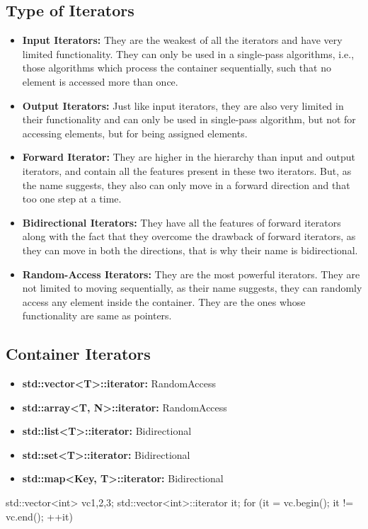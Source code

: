 \documentclass{report}
\begin{document}
    \subsection{Type of Iterators}
    \bigbreak \noindent 
    \begin{itemize}
        \item \textbf{Input Iterators:} They are the weakest of all the iterators and have very limited functionality. They can only be used in a single-pass algorithms, i.e., those algorithms which process the container sequentially, such that no element is accessed more than once.
        \item \textbf{Output Iterators:} Just like input iterators, they are also very limited in their functionality and can only be used in single-pass algorithm, but not for accessing elements, but for being assigned elements.
        \item \textbf{Forward Iterator:} They are higher in the hierarchy than input and output iterators, and contain all the features present in these two iterators. But, as the name suggests, they also can only move in a forward direction and that too one step at a time.
        \item \textbf{Bidirectional Iterators:} They have all the features of forward iterators along with the fact that they overcome the drawback of forward iterators, as they can move in both the directions, that is why their name is bidirectional.
        \item \textbf{Random-Access Iterators:} They are the most powerful iterators. They are not limited to moving sequentially, as their name suggests, they can randomly access any element inside the container. They are the ones whose functionality are same as pointers.
    \end{itemize}
    \smallbreak \noindent
    \begin{figure}[ht]
        \centering
        \label{fig:it2}
    \end{figure}

    \pagebreak
    \subsection{Container Iterators}
    \begin{itemize}
        \item \textbf{std::vector<T>::iterator:} RandomAccess
        \item \textbf{std::array<T, N>::iterator:} RandomAccess
        \item \textbf{std::list<T>::iterator:} Bidirectional  
        \item \textbf{std::set<T>::iterator:} Bidirectional
        \item \textbf{std::map<Key, T>::iterator:} Bidirectional
    \end{itemize}
    \bigbreak \noindent 
    \begin{cppcode}
        std::vector<int> vc{1,2,3};
        std::vector<int>::iterator it;
        for (it = vc.begin(); it != vc.end(); ++it)
    \end{cppcode}
\end{document}

